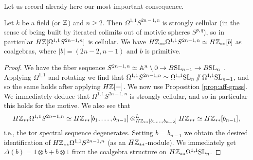 \documentclass{amsart}
\numberwithin{proposition}{section}
\numberwithin{equation}{section}
\newcommand{\Gr}[1]{{\mathrm{Gr}_{#1}}}
\begin{document}

Let us record already here our most important consequence.
\begin{corollary} \label{cor:Omega11-S2n-1}
Let $k$ be a field (or $\mathbb{Z}$) and $n \ge 2$.
Then $\Omega^{1,1}S^{2n-1,n}$ is strongly cellular (in the sense of being built by iterated colimits out of motivic spheres $S^{p,q}$), so in particular $H\mathbb{Z}[\Omega^{1,1}S^{2n-1,n}]$ is cellular.
We have $H\mathbb{Z}_{**}\Omega^{1,1}S^{2n-1,n} \simeq H\mathbb{Z}_{**}[b]$ as coalgebras, where $|b|=(2n-2,n-1)$ and $b$ is primitive.
\end{corollary}
\begin{proof}
We have the fiber sequence $S^{2n-1,n} \simeq \mathbb A^n \setminus 0 \to B\mathrm{SL}_{n-1} \to B\mathrm{SL}_n$ \cite[Theorems~2.2.5 and 3.3.1, proof of Corollary~4.2.6]{asok2015affine}.
Applying $\Omega^{1,1}$ and rotating we find that $\Omega^{1,1}S^{2n-1,n} \simeq \Omega^{1,1}\mathrm{SL}_n \sslash \Omega^{1,1}\mathrm{SL}_{n-1}$, and so the same holds after applying $H\mathbb{Z}[\mathord-]$.
We now use Proposition \ref{prop:aff-grass}.
We immediately deduce that $\Omega^{1,1}S^{2n-1,n}$ is strongly cellular, and so in particular this holds for the motive.
We also see that \[ H\mathbb{Z}_{**} \Omega^{1,1}S^{2n-1,n} \simeq H\mathbb{Z}_{**}[b_1, \dots, b_{n-1}] \otimes^L_{H\mathbb{Z}_{**}[b_1, \dots, b_{n-2}]} H\mathbb{Z}_{**} \simeq H\mathbb{Z}_{**}[b_{n-1}], \] i.e., the tor spectral sequence degenerates.
Setting $b=b_{n-1}$ we obtain the desired identification of $H\mathbb{Z}_{**} \Omega^{1,1}S^{2n-1,n}$ (as an $H\mathbb{Z}_{**}$-module).
We immediately get $\Delta(b) = 1 \otimes b + b \otimes 1$ from the coalgebra structure on $H\mathbb{Z}_{**}\Omega^{1,1}\mathrm{SL}_n$.
\end{proof}
\end{document}
